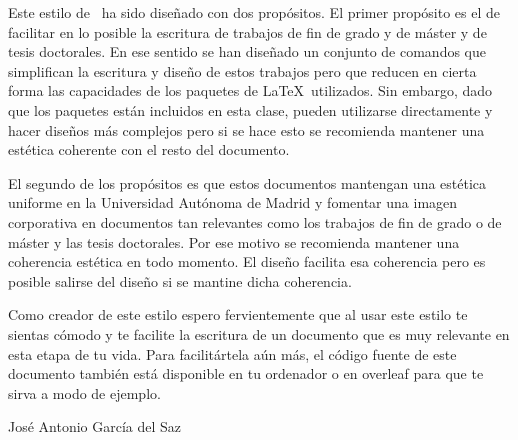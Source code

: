 Este estilo de \LaTeXe\ ha sido diseñado con dos propósitos. El primer propósito es el de facilitar en lo posible la escritura de trabajos de fin de grado y de máster y de tesis doctorales. En ese sentido se han diseñado un conjunto de comandos que simplifican la escritura y diseño de estos trabajos pero que reducen en cierta forma las capacidades de los paquetes de \LaTeX\ utilizados. Sin embargo, dado que los paquetes están incluidos en esta clase, pueden utilizarse directamente y hacer diseños más complejos pero si se hace esto se recomienda mantener una estética coherente con el resto del documento.

El segundo de los propósitos es que estos documentos mantengan una estética uniforme en la Universidad Autónoma de Madrid y fomentar una imagen corporativa en documentos tan relevantes como los trabajos de fin de grado o de máster y las tesis doctorales. Por ese motivo se recomienda mantener una coherencia estética en todo momento. El diseño facilita esa coherencia pero es posible salirse del diseño si se mantine dicha coherencia.

Como creador de este estilo espero fervientemente que al usar este estilo te sientas cómodo y te facilite la escritura de un documento que es muy relevante en esta etapa de tu vida. Para facilitártela aún más, el código fuente de este documento también está disponible en tu ordenador o en overleaf para que te sirva a modo de ejemplo.

\hfill \begin{flushright}José Antonio García del Saz\end{flushright}\hfill

